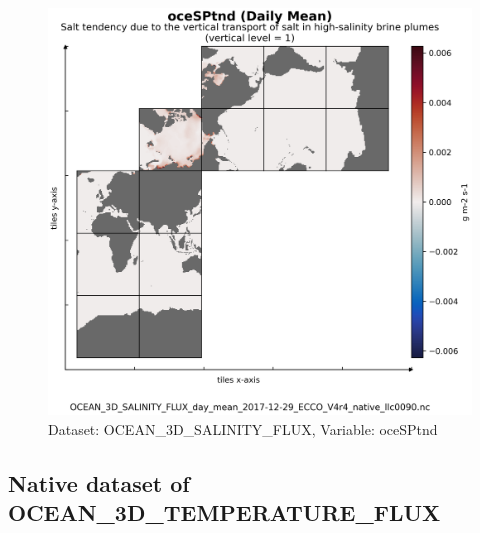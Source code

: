 \begin{figure}[H]
\centering
\includegraphics[scale=0.55]{../images/plots/v4r4/native_plots/Ocean_Three-Dimensional_Salinity_Fluxes/oceSPtnd.png}
\caption{Dataset: OCEAN\_3D\_SALINITY\_FLUX, Variable: oceSPtnd}
\label{tab:table-OCEAN_3D_SALINITY_FLUX_oceSPtnd-Plot}
\end{figure}
\newpage
\subsection{Native dataset of OCEAN\_3D\_TEMPERATURE\_FLUX}
\newp
